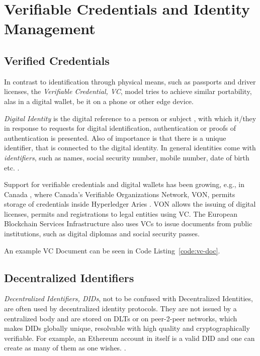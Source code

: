 \section{Verifiable Credentials and Identity Management} %
\label{sec:Verifiable Credentials and Identity Management}

\subsection{Verified Credentials} %
\label{sub:Verified Credentials}
In contrast to identification through physical means, such as passports and driver licenses, the
\textit{Verifiable Credential, VC}, model tries to achieve similar portability, alas in a digital wallet, be it on a
phone or other edge device. \cite{w3c2019verifiablecredentials}

\textit{Digital Identity} is the digital reference to a person or subject \cite{Domingo_2020}, with which it/they in
response to requests for digital identification, authentication or proofs of authentication is presented. Also of
importance is that there is a unique identifier, that is connected to the digital identity.
\cite{Sedlmeir_Smethurst_Rieger_Fridgen_2021}
In general identities come with \textit{identifiers}, such as names, social security number, mobile number, date of
birth etc. \cite{eth-decentralized-identity}.

Support for verifiable credentials and digital wallets has been growing, e.g., in Canada \cite{preukschat2021self},
where Canada's Verifiable Organizations Network, VON, permits storage of credentials inside Hyperledger Aries
\cite{hyperledger:wiki}. VON allows the issuing of digital licenses, permits and registrations to legal entities using
VC.
The European Blockchain Services Infrastructure also uses VCs to issue documents from public institutions, such as
digital diplomas and social security passes. \cite{williams2020cross}

An example VC Document can be seen in Code Listing~\ref{code:vc-doc}.

\subsection{Decentralized Identifiers} %
\label{sec:Decentralized Identifiers}
\textit{Decentralized Identifiers, DIDs}, not to be confused with Decentralized Identities, are often used by
decentralized identity protocols. \cite{w3c2022did} They are not issued by a centralized body and are stored on DLTs
or on peer-2-peer networks, which makes DIDs globally unique, resolvable with high quality and cryptographically
verifiable. \cite{w3c-did-primer} For example, an Ethereum account in itself is a valid DID and one can create as many
of them as one wishes. \cite{eth-decentralized-identity}.

